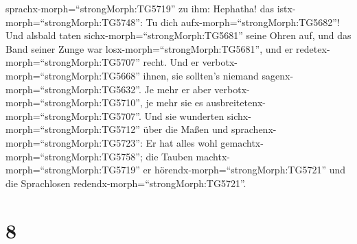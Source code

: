 sprachx-morph=``strongMorph:TG5719'' zu ihm: Hephatha! das
istx-morph=``strongMorph:TG5748'': Tu dich
aufx-morph=``strongMorph:TG5682''!  Und alsbald taten
sichx-morph=``strongMorph:TG5681'' seine Ohren auf, und das Band seiner
Zunge war losx-morph=``strongMorph:TG5681'', und er
redetex-morph=``strongMorph:TG5707'' recht.  Und er
verbotx-morph=``strongMorph:TG5668'' ihnen, sie sollten's niemand
sagenx-morph=``strongMorph:TG5632''. Je mehr er aber
verbotx-morph=``strongMorph:TG5710'', je mehr sie es
ausbreitetenx-morph=``strongMorph:TG5707''.  Und sie
wunderten sichx-morph=``strongMorph:TG5712'' über die Maßen und
sprachenx-morph=``strongMorph:TG5723'': Er hat alles wohl
gemachtx-morph=``strongMorph:TG5758''; die Tauben
machtx-morph=``strongMorph:TG5719'' er
hörendx-morph=``strongMorph:TG5721'' und die Sprachlosen
redendx-morph=``strongMorph:TG5721''.

\hypertarget{section-7}{%
\section{8}\label{section-7}}

